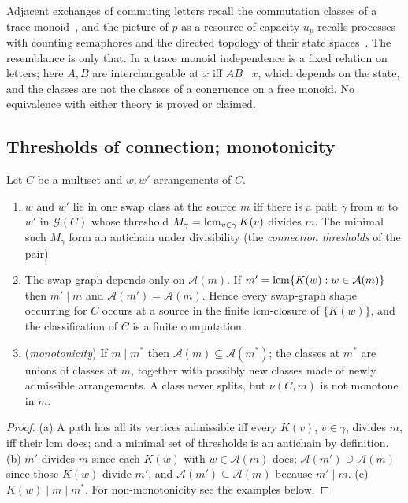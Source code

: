 \begin{remark}\label{rem:traces}
Adjacent exchanges of commuting letters recall the commutation classes of a trace monoid~\cite{CartierFoata1969,Mazurkiewicz1987,DiekertRozenberg1995}, and the picture of $p$ as a resource of capacity $u_p$ recalls processes with counting semaphores and the directed topology of their state spaces~\cite{Pratt1991,FajstrupEtAl2016}. The resemblance is only that. In a trace monoid independence is a fixed relation on letters; here $A,B$ are interchangeable at $x$ iff $AB\mid x$, which depends on the state, and the classes are not the classes of a congruence on a free monoid. No equivalence with either theory is proved or claimed.
\end{remark}

\subsection{Thresholds of connection; monotonicity}
\begin{theorem}\label{thm:paths}
Let $C$ be a multiset and $w,w'$ arrangements of $C$.
\begin{enumerate}[label=(\alph*),itemsep=1pt]
\item $w$ and $w'$ lie in one swap class at the source $m$ iff there is a path $\gamma$ from $w$ to $w'$ in $\mathcal G(C)$ whose threshold $M_\gamma=\operatorname{lcm}_{v\in\gamma}K(v)$ divides $m$. The minimal such $M_\gamma$ form an antichain under divisibility (the \emph{connection thresholds} of the pair).
\item The swap graph depends only on $\mathcal A(m)$. If $m'=\operatorname{lcm}\{K(w):w\in\mathcal A(m)\}$ then $m'\mid m$ and $\mathcal A(m')=\mathcal A(m)$. Hence every swap-graph shape occurring for $C$ occurs at a source in the finite lcm-closure of $\{K(w)\}$, and the classification of $C$ is a finite computation.
\item (\emph{monotonicity}) If $m\mid m^*$ then $\mathcal A(m)\subseteq\mathcal A(m^*)$; the classes at $m^*$ are unions of classes at $m$, together with possibly new classes made of newly admissible arrangements. A class never splits, but $\nu(C,m)$ is not monotone in $m$.
\end{enumerate}
\end{theorem}
\begin{proof}
(a) A path has all its vertices admissible iff every $K(v)$, $v\in\gamma$, divides $m$, iff their lcm does; and a minimal set of thresholds is an antichain by definition. (b) $m'$ divides $m$ since each $K(w)$ with $w\in\mathcal A(m)$ does; $\mathcal A(m')\supseteq\mathcal A(m)$ since those $K(w)$ divide $m'$, and $\mathcal A(m')\subseteq\mathcal A(m)$ because $m'\mid m$. (c) $K(w)\mid m\mid m^*$. For non-monotonicity see the examples below.
\end{proof}
